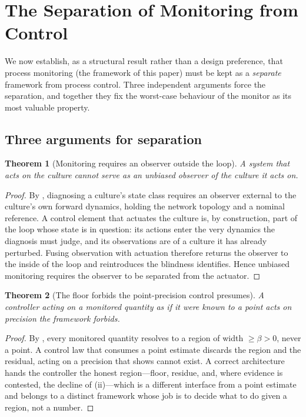 \documentclass[11pt,twocolumn,a4paper]{article}
\theoremstyle{thmstyle}
\newtheorem{theorem}{Theorem}[section]
\theoremstyle{definition}
\theoremstyle{remark}
\newcommand{\floorc}{\beta}
\begin{document}
\section{The Separation of Monitoring from Control}
\label{sec:separation}

We now establish, as a structural result rather than a design preference,
that process monitoring (the framework of this paper) must be kept as a
\emph{separate} framework from process control. Three independent arguments
force the separation, and together they fix the worst-case behaviour of the
monitor as its most valuable property.

\subsection{Three arguments for separation}

\begin{theorem}[Monitoring requires an observer outside the loop]
\label{thm:sep-blindness}
A system that acts on the culture cannot serve as an unbiased observer of
the culture it acts on.
\end{theorem}

\begin{proof}
By , diagnosing a culture's state class requires an
observer external to the culture's own forward dynamics, holding the network
topology and a nominal reference. A control element that actuates the
culture is, by construction, part of the loop whose state is in question:
its actions enter the very dynamics the diagnosis must judge, and its
observations are of a culture it has already perturbed. Fusing observation
with actuation therefore returns the observer to the inside of the loop and
reintroduces the blindness  identifies. Hence unbiased
monitoring requires the observer to be separated from the actuator.
\end{proof}

\begin{theorem}[The floor forbids the point-precision control presumes]
\label{thm:sep-floor}
A controller acting on a monitored quantity as if it were known to a point
acts on precision the framework forbids.
\end{theorem}

\begin{proof}
By , every monitored quantity resolves to a region of
width $\ge\floorc>0$, never a point. A control law that consumes a point
estimate discards the region and the residual, acting on a precision that
 shows cannot exist. A correct architecture hands the
controller the honest region---floor, residue, and, where evidence is
contested, the decline of (ii)---which is a different
interface from a point estimate and belongs to a distinct framework whose
job is to decide what to do given a region, not a number.
\end{proof}
\end{document}
